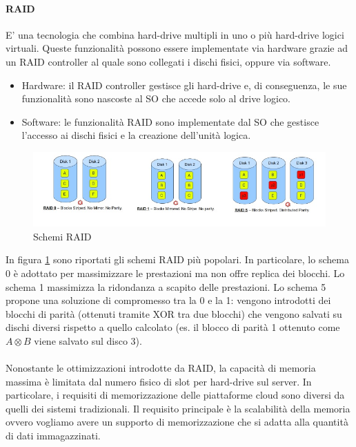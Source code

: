 \documentclass{article}
\begin{document}
\paragraph{RAID} E' una tecnologia che combina hard-drive multipli in uno o più hard-drive logici virtuali. Queste funzionalità possono essere implementate via hardware grazie ad un RAID controller al quale sono collegati i dischi fisici, oppure via software.
\begin{itemize}
    \item Hardware: il RAID controller gestisce gli hard-drive e, di conseguenza, le sue funzionalità sono nascoste al SO che accede solo al drive logico.
    \item Software: le funzionalità RAID sono implementate dal SO che gestisce l'accesso ai dischi fisici e la creazione dell'unità logica.
\end{itemize}

\begin{figure}[H]
    \centering
    \includegraphics[scale=0.7]{img/raid.jpg}
    \caption{Schemi RAID}
    \label{fig:raid}
\end{figure}\noindent
In figura \ref{fig:raid} sono riportati gli schemi RAID più popolari. In particolare, lo schema 0 è adottato per massimizzare le prestazioni ma non offre replica dei blocchi. Lo schema 1 massimizza la ridondanza a scapito delle prestazioni. Lo schema 5 propone una soluzione di compromesso tra la 0 e la 1: vengono introdotti dei blocchi di parità (ottenuti tramite XOR tra due blocchi) che vengono salvati su dischi diversi rispetto a quello calcolato (es. il blocco di parità 1 ottenuto come \( A \otimes B \) viene salvato sul disco 3).\\ \\
Nonostante le ottimizzazioni introdotte da RAID, la capacità di memoria massima è limitata dal numero fisico di slot per hard-drive sul server. In particolare, i requisiti di memorizzazione delle piattaforme cloud sono diversi da quelli dei sistemi tradizionali. Il requisito principale è la scalabilità della memoria ovvero vogliamo avere un supporto di memorizzazione che si adatta alla quantità di dati immagazzinati.
\end{document}
